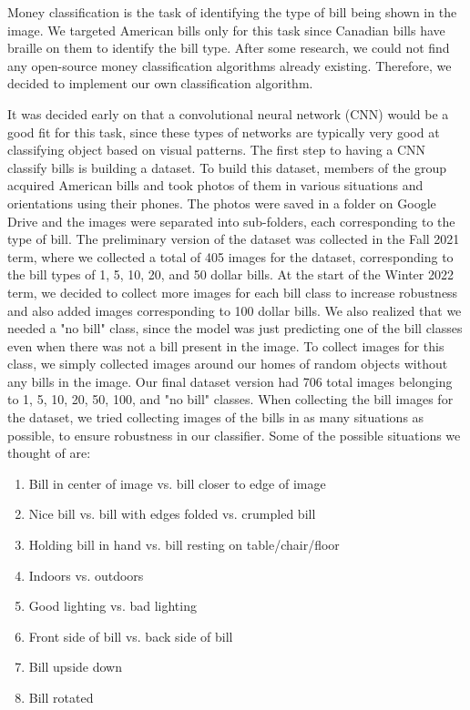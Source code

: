 \documentclass[a4paper,11pt]{article}
\begin{document}
Money classification is the task of identifying the type of bill being shown in the image. We targeted American bills only for this task since Canadian bills have braille on them to identify the bill type. After some research, we could not find any open-source money classification algorithms already existing. Therefore, we decided to implement our own classification algorithm.

It was decided early on that a convolutional neural network (CNN) would be a good fit for this task, since these types of networks are typically very good at classifying object based on visual patterns. The first step to having a CNN classify bills is building a dataset. To build this dataset, members of the group acquired American bills and took photos of them in various situations and orientations using their phones. The photos were saved in a folder on Google Drive and the images were separated into sub-folders, each corresponding to the type of bill. The preliminary version of the dataset was collected in the Fall 2021 term, where we collected a total of 405 images for the dataset, corresponding to the bill types of 1, 5, 10, 20, and 50 dollar bills. At the start of the Winter 2022 term, we decided to collect more images for each bill class to increase robustness and also added images corresponding to 100 dollar bills. We also realized that we needed a "no bill" class, since the model was just predicting one of the bill classes even when there was not a bill present in the image. To collect images for this class, we simply collected images around our homes of random objects without any bills in the image. Our final dataset version had 706 total images belonging to 1, 5, 10, 20, 50, 100, and "no bill" classes. When collecting the bill images for the dataset, we tried collecting images of the bills in as many situations as possible, to ensure robustness in our classifier. Some of the possible situations we thought of are:

\begin{enumerate}
    \item Bill in center of image vs. bill closer to edge of image
    \item Nice bill vs. bill with edges folded vs. crumpled bill
    \item Holding bill in hand vs. bill resting on table/chair/floor
    \item Indoors vs. outdoors
    \item Good lighting vs. bad lighting
    \item Front side of bill vs. back side of bill
    \item Bill upside down
    \item Bill rotated
\end{enumerate}
\end{document}
